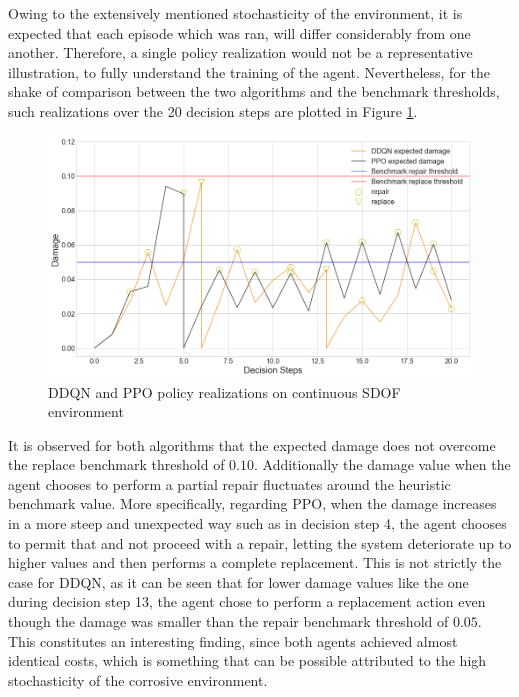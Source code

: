 Owing to the extensively mentioned stochasticity of the environment, it is expected that each episode which was ran, will differ considerably from one another. Therefore, a single policy realization would not be a representative illustration, to fully understand the training of the agent. Nevertheless, for the shake of comparison between the two algorithms and the benchmark thresholds, such realizations over the 20 decision steps are plotted in Figure \ref{continuousPolicy}.

\begin{figure}[H]
    \centering
	\includegraphics[width=\linewidth]{Figures/continuousPolicies.png}
	\caption{\gls{DDQN} and \gls{PPO} policy realizations on continuous \gls{SDOF} environment}
	\label{continuousPolicy}
\end{figure}

It is observed for both algorithms that the expected damage does not overcome the replace benchmark threshold of $0.10$. Additionally the damage value when the agent chooses to perform a partial repair fluctuates around the heuristic benchmark value. More specifically, regarding \gls{PPO}, when the damage increases in a more steep and unexpected way such as in decision step 4, the agent chooses to permit that and not proceed with a repair, letting the system deteriorate up to higher values and then performs a complete replacement. This is not strictly the case for \gls{DDQN}, as it can be seen that for lower damage values like the one during decision step 13, the agent chose to perform a replacement action even though the damage was smaller than the repair benchmark threshold of $0.05$. This constitutes an interesting finding, since both agents achieved almost identical costs, which is something that can be possible attributed to the high stochasticity of the corrosive environment. 

